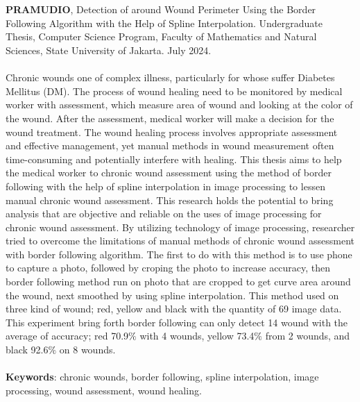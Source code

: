 \chapter*{}
\singlespacing{}

\textbf{PRAMUDIO}, Detection of around Wound Perimeter Using the 
Border Following Algorithm with the Help of Spline Interpolation. Undergraduate Thesis, Computer Science Program, Faculty of 
Mathematics and Natural Sciences, State University of Jakarta. July 2024.
\\
\\
Chronic wounds one of complex illness, particularly for whose suffer 
Diabetes Mellitus (DM). The process of wound healing need to be monitored 
by medical worker with assessment, which measure area of wound and looking at 
the color of the wound. After the assessment, medical worker will make a decision 
for the wound treatment. 
The wound healing process involves appropriate assessment 
and effective management, yet manual methods in wound measurement often 
time-consuming and potentially interfere with healing. This thesis aims to 
help the medical worker to chronic wound assessment using the method of 
border following with the help of spline interpolation in image processing 
to lessen manual chronic wound assessment. This research holds the potential 
to bring analysis that are objective and reliable on the uses of image 
processing for chronic wound assessment. By utilizing technology of 
image processing, researcher tried to overcome the limitations of manual 
methods of chronic wound assessment with border following algorithm. 
The first to do with this method is to use phone to capture a photo, 
followed by croping the photo to increase accuracy, then border following 
method run on photo that are cropped to get curve area around the wound, 
next smoothed by using spline interpolation. This method used on three kind 
of wound; red, yellow and black with the quantity of 69 image data. This experiment 
bring forth border following can only detect 14 wound with the average of accuracy; 
red 70.9$\%$ with 4 wounds, yellow 73.4$\%$ from 2 wounds, and black 92.6$\%$ 
on 8 wounds.
\\
\\
\textbf{Keywords}: chronic wounds, border following, spline interpolation, 
image processing, wound assessment, wound healing.

